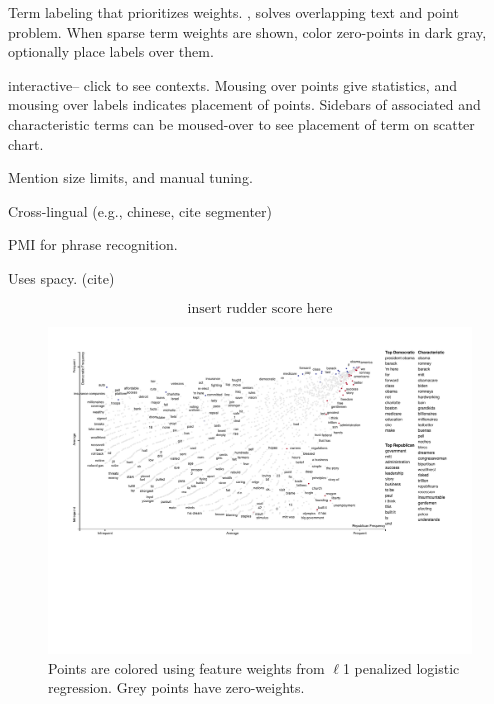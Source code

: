 \documentclass[11pt]{article}
\begin{document}
Term labeling that prioritizes weights. \cite{cozy}, solves overlapping text and point problem.  When sparse term weights are shown, color zero-points in dark gray, optionally place labels over them.  

interactive-- click to see contexts.  Mousing over points give statistics, and mousing over labels indicates placement of points.  Sidebars of associated and characteristic terms can be moused-over to see placement of term on scatter chart.

Mention size limits, and manual tuning.  

Cross-lingual (e.g., chinese, cite segmenter)

PMI for phrase recognition.

Uses spacy. (cite)

\begin{equation}
  \mbox{insert rudder score here}
  \label{eqn:cornerscore}
\end{equation}

\begin{figure}[h]
  \includegraphics[width=\linewidth]{sparse_scattertext}
  \caption{Points are colored using feature weights from $\ell$1 penalized logistic regression.  Grey points have zero-weights.}
  \label{scattertextsparse}
\end{figure}
\end{document}
